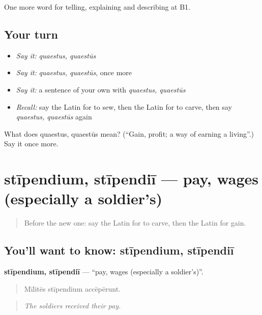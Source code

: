 \begin{grammarlens}[title={What you've built}]
One more word for telling, explaining and describing at B1.
\end{grammarlens}

\subsection*{Your turn}
\begin{itemize}
\raggedright
  \item \emph{Say it:} \emph{quaestus, quaestūs}
  \item \emph{Say it:} \emph{quaestus, quaestūs}, once more
  \item \emph{Say it:} a sentence of your own with \emph{quaestus, quaestūs}
  \item \emph{Recall:} say the Latin for to sew, then the Latin for to carve, then say \emph{quaestus, quaestūs} again
\end{itemize}

\begin{tcolorbox}[breakable,colback=teal!4,colframe=teal!35!black,title={Before you move on}]
What does quaestus, quaestūs mean? (\textquotedblleft{}Gain, profit; a way of earning a living\textquotedblright{}.) Say it once more.
\end{tcolorbox}
\section[stīpendium, stīpendiī]{stīpendium, stīpendiī — pay, wages (especially a soldier's)}

\label{lesson:LA-C379-stipendium}



\begin{quote}
Before the new one: say the Latin for to carve, then the Latin for gain.
\end{quote}

\subsection*{You'll want to know: stīpendium, stīpendiī}
\textbf{stīpendium, stīpendiī} — \textquotedblleft{}pay, wages (especially a soldier's)\textquotedblright{}.

\begin{quote}
Mīlitēs stīpendium accēpērunt.
\end{quote}

\begin{quote}
\emph{The soldiers received their pay.}
\end{quote}

